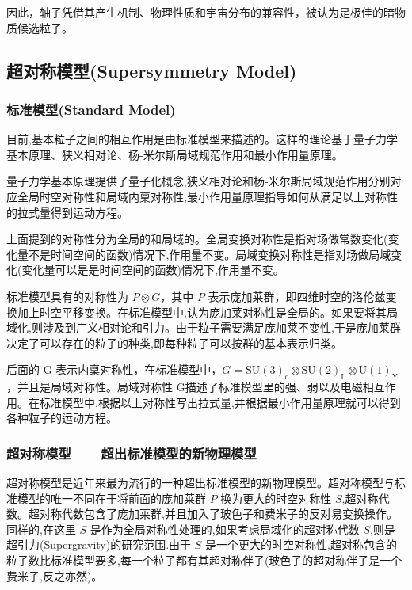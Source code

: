 因此，轴子凭借其产生机制、物理性质和宇宙分布的兼容性，被认为是极佳的暗物质候选粒子。

\subsection{超对称模型(Supersymmetry Model)}

\subsubsection{标准模型(Standard Model)}

目前,基本粒子之间的相互作用是由标准模型来描述的。这样的理论基于量子力学基本原理、狭义相对论、杨-米尔斯局域规范作用和最小作用量原理。

量子力学基本原理提供了量子化概念,狭义相对论和杨-米尔斯局域规范作用分别对应全局时空对称性和局域内稟对称性,最小作用量原理指导如何从满足以上对称性的拉式量得到运动方程。

上面提到的对称性分为全局的和局域的。全局变换对称性是指对场做常数变化(变化量不是时间空间的函数)情况下,作用量不变。局域变换对称性是指对场做局域变化(变化量可以是是时间空间的函数)情况下,作用量不变。

标准模型具有的对称性为 $P\otimes G$，其中 $P$ 表示庞加莱群，即四维时空的洛伦兹变换加上时空平移变换。在标准模型中,认为庞加莱对称性是全局的。如果要将其局域化,则涉及到广义相对论和引力。由于粒子需要满足庞加莱不变性,于是庞加莱群决定了可以存在的粒子的种类,即每种粒子可以按群的基本表示归类。

后面的 G 表示内稟对称性，在标准模型中，$G=\mathrm{SU(3)_c \otimes SU(2)_L \otimes U(1)_Y }$，并且是局域对称性。局域对称性 G描述了标准模型里的强、弱以及电磁相互作用。在标准模型中,根据以上对称性写出拉式量,并根据最小作用量原理就可以得到各种粒子的运动方程。

\subsubsection{超对称模型——超出标准模型的新物理模型}

超对称模型是近年来最为流行的一种超出标准模型的新物理模型。超对称模型与标准模型的唯一不同在于将前面的庞加莱群 $P$ 换为更大的时空对称性 $S$,超对称代数。超对称代数包含了庞加莱群,并且加入了玻色子和费米子的反对易变换操作。同样的,在这里 $S$ 是作为全局对称性处理的,如果考虑局域化的超对称代数 $S$,则是超引力(Supergravity)的研究范围.由于 $S$ 是一个更大的时空对称性,超对称包含的粒子数比标准模型要多,每一个粒子都有其超对称伴子(玻色子的超对称伴子是一个费米子,反之亦然)。

